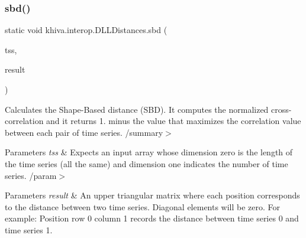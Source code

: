 \mbox{\label{classkhiva_1_1interop_1_1_d_l_l_distances_a5286690f1572dc2f1a71e8bc85c3266a}} 
\subsubsection{\texorpdfstring{sbd()}{sbd()}}
{\footnotesize\ttfamily static void khiva.\+interop.\+D\+L\+L\+Distances.\+sbd (\begin{DoxyParamCaption}\item[{\mbox{[}\+In\mbox{]} ref Int\+Ptr}]{tss,  }\item[{\mbox{[}\+Out\mbox{]} out Int\+Ptr}]{result }\end{DoxyParamCaption})\hspace{0.3cm}{\ttfamily [static]}}



Calculates the Shape-\/\+Based distance (S\+BD). It computes the normalized cross-\/correlation and it returns 1. minus the value that maximizes the correlation value between each pair of time series. /summary$>$ 
\begin{DoxyParams}{Parameters}
{\em tss} & Expects an input array whose dimension zero is the length of the time series (all the same) and dimension one indicates the number of time series. /param$>$ 
\begin{DoxyParams}{Parameters}
{\em result} & An upper triangular matrix where each position corresponds to the distance between two time series. Diagonal elements will be zero. For example\+: Position row 0 column 1 records the distance between time series 0 and time series 1.\\
\hline
\end{DoxyParams}
\\
\hline
\end{DoxyParams}


\mbox{\label{classkhiva_1_1interop_1_1_d_l_l_distances_a3a8cc5cc29f67e204899e32694bd1bc7}} 
